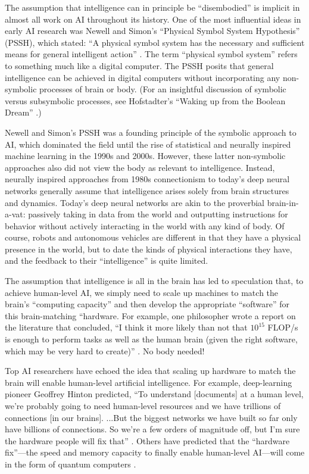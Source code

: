 \documentclass{article}
\begin{document}
The assumption that intelligence can in principle be ``disembodied'' is implicit in almost all work on AI throughout its history.  One of the most influential ideas in early AI research was Newell and Simon's ``Physical Symbol System Hypothesis'' (PSSH), which stated: ``A physical symbol system has the necessary and sufficient means for general intelligent action'' \cite{Newell1976}. The term ``physical symbol system'' refers to something much like a digital computer.  The PSSH posits that general intelligence can be achieved in digital computers without incorporating any non-symbolic processes of brain or body.  (For an insightful discussion of symbolic versus subsymbolic processes, see Hofstadter's ``Waking up from the Boolean Dream'' \cite{Hofstadter1985b}.)

Newell and Simon's PSSH was a founding principle of the symbolic approach to AI, which dominated the field until the rise of statistical and neurally inspired machine learning in the 1990s and 2000s.  However, these latter non-symbolic approaches also did not view the body as relevant to intelligence.  Instead, neurally inspired approaches from 1980s connectionism to today's deep neural networks generally assume that intelligence arises solely from brain structures and dynamics.  Today's deep neural networks are akin to the proverbial brain-in-a-vat: passively taking in data from the world and outputting instructions for behavior without actively interacting in the world with any kind of body.  Of course, robots and autonomous vehicles are different in that they have a physical presence in the world, but to date the kinds of physical interactions they have, and the feedback to their ``intelligence'' is quite limited. 

The assumption that intelligence is all in the brain has led to speculation that, to achieve human-level AI, we simply need to scale up machines to match the brain's ``computing capacity'' and then develop the appropriate ``software'' for this brain-matching ``hardware.  For example, one philosopher wrote a report on the literature that concluded, ``I think it more likely than not that $10^{15}$ FLOP/s is enough to perform tasks as well as the human brain (given the right software, which may be very hard to create)'' \cite{Carlsmith2020}.  No body needed!

Top AI researchers have echoed the idea that scaling up hardware to match the brain will enable human-level artificial intelligence.  For example, deep-learning pioneer Geoffrey Hinton predicted, ``To understand [documents] at a human level, we're probably going to need human-level resources and we have trillions of connections [in our brains]. ...But the biggest networks we have built so far only have billions of connections. So we're a few orders of magnitude off, but I'm sure the hardware people will fix that'' \cite{Patterson2017}. Others have predicted that the ``hardware fix''---the speed and memory capacity to finally enable human-level AI---will come in the form of quantum computers \cite{Musser2018}. 
\end{document}
